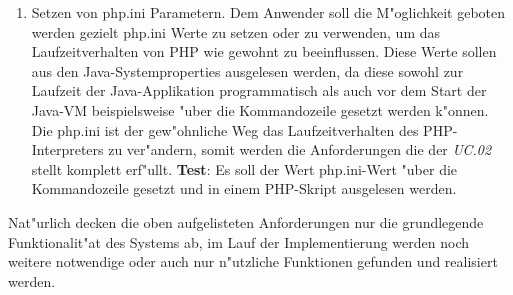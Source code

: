 \begin{enumerate}
\item Setzen von php.ini Parametern. Dem Anwender soll die M"oglichkeit geboten werden gezielt php.ini Werte zu setzen oder zu verwenden,
    um das Laufzeitverhalten von PHP wie gewohnt zu beeinflussen. Diese Werte sollen aus den Java-Systemproperties ausgelesen werden,
    da diese sowohl zur Laufzeit der Java-Applikation programmatisch als auch vor dem Start der Java-VM beispielsweise "uber die Kommandozeile
    gesetzt werden k"onnen. Die php.ini ist der gew"ohnliche Weg das Laufzeitverhalten des PHP-Interpreters zu ver"andern, somit werden
    die Anforderungen die der  \emph{UC.02} stellt komplett erf"ullt.
    \textbf{Test}: Es soll der Wert php.ini-Wert  "uber die Kommandozeile gesetzt und in einem
    PHP-Skript ausgelesen werden. 

\end{enumerate}

Nat"urlich decken die oben aufgelisteten Anforderungen nur die grundlegende Funktionalit"at des Systems ab, im Lauf der Implementierung werden
noch weitere notwendige oder auch nur n"utzliche Funktionen gefunden und realisiert werden.
